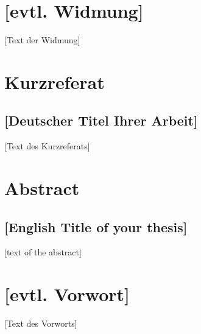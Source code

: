 \newpage
\section*{[evtl. Widmung]}   %

[Text der Widmung]

\newpage
\section*{Kurzreferat}

\subsection*{[Deutscher Titel Ihrer Arbeit]}

[Text des Kurzreferats]


\newpage
\section*{Abstract}
\subsection*{[English Title of your thesis]}

[text of the abstract]


\newpage
\section*{[evtl. Vorwort]}   %

[Text des Vorworts]
